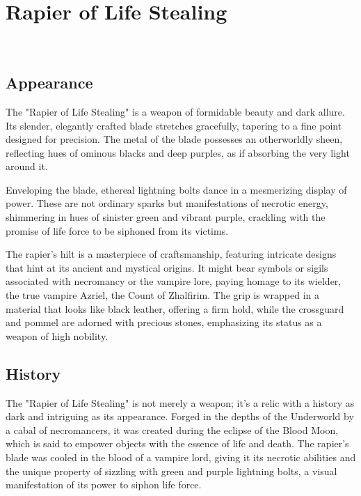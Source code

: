 
\chapter*{Rapier of Life Stealing}
\\

\section*{\hspace*{4cm}Appearance}
The "Rapier of Life Stealing" is a weapon of formidable beauty and dark allure. Its slender, elegantly crafted blade stretches gracefully, tapering to a fine point designed for precision. The metal of the blade possesses an otherworldly sheen, reflecting hues of ominous blacks and deep purples, as if absorbing the very light around it.

Enveloping the blade, ethereal lightning bolts dance in a mesmerizing display of power. These are not ordinary sparks but manifestations of necrotic energy, shimmering in hues of sinister green and vibrant purple, crackling with the promise of life force to be siphoned from its victims.

The rapier's hilt is a masterpiece of craftsmanship, featuring intricate designs that hint at its ancient and mystical origins. It might bear symbols or sigils associated with necromancy or the vampire lore, paying homage to its wielder, the true vampire Azriel, the Count of Zhalfirim. The grip is wrapped in a material that looks like black leather, offering a firm hold, while the crossguard and pommel are adorned with precious stones, emphasizing its status as a weapon of high nobility.

\section*{History}
The "Rapier of Life Stealing" is not merely a weapon; it's a relic with a history as dark and intriguing as its appearance. Forged in the depths of the Underworld by a cabal of necromancers, it was created during the eclipse of the Blood Moon, which is said to empower objects with the essence of life and death. The rapier's blade was cooled in the blood of a vampire lord, giving it its necrotic abilities and the unique property of sizzling with green and purple lightning bolts, a visual manifestation of its power to siphon life force.

